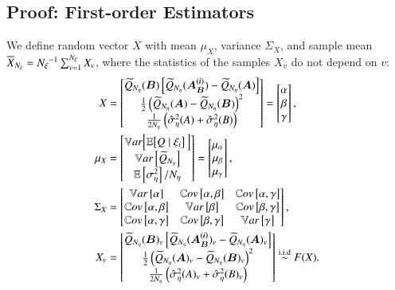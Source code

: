 \subsection{Proof: First-order Estimators} \label{sec:proof-first-order}
We define random vector $X$ with mean $\mu_X$, variance $\Sigma_X$, and sample mean $\overline{X}_{{N_\xi}} = {N_\xi}^{-1} \sum_{v=1}^{{N_\xi}} X_v$, where the statistics of the samples $X_v$ do not depend on $v$:
\begin{align} \label{m4eq:xmatrix}
    X &= \begin{bmatrix} \widetilde{Q}_{{N_\eta}}(\bm{B}) \left[ \widetilde{Q}_{{N_\eta}}(\bm{A_B^{(i)}}) - \widetilde{Q}_{{N_\eta}}(\bm{A}) \right] \\
                        \frac{1}{2} \left( \widetilde{Q}_{{N_\eta}}(\bm{A}) - \widetilde{Q}_{{N_\eta}}(\bm{B}) \right)^2 \\
                        \frac{1}{2{N_\eta}} \left( \hat{\sigma}^2_\eta(A) + \hat{\sigma}^2_\eta(B) \right)
        \end{bmatrix}
        = \begin{bmatrix} \alpha \\ \beta \\ \gamma \end{bmatrix}, \\
    \mu_X &= \begin{bmatrix} \mathbb{V}ar\Bigl[ \mathbb{E}\bigl[Q\mid\xi_i\bigr] \, {} \Bigr] \\ \mathbb{V}ar\left[\widetilde{Q}_{{N_\eta}}\right] \\ \mathbb{E}\left[\sigma^2_\eta\right]/{N_\eta} \end{bmatrix} 
        = \begin{bmatrix} \mu_\alpha \\ \mu_\beta \\ \mu_\gamma \end{bmatrix}, \\
    \Sigma_X &= \begin{bmatrix}
        \mathbb{V}ar\left[\alpha\right] & \mathbb{C}ov\left[\alpha,\beta\right] & \mathbb{C}ov\left[\alpha,\gamma\right] \\ 
        \mathbb{C}ov\left[\alpha,\beta\right] & \mathbb{V}ar\left[\beta\right] & \mathbb{C}ov\left[\beta,\gamma\right] \\
        \mathbb{C}ov\left[\alpha,\gamma\right] & \mathbb{C}ov\left[\beta,\gamma\right] & \mathbb{V}ar\left[\gamma\right]
    \end{bmatrix} , \\
    X_v &= \begin{bmatrix} \widetilde{Q}_{{N_\eta}}(\bm{B})_v \left[ \widetilde{Q}_{{N_\eta}}(\bm{A_B^{(i)}})_v - \widetilde{Q}_{{N_\eta}}(\bm{A})_v \right] \\
                        \frac{1}{2} \left( \widetilde{Q}_{{N_\eta}}(\bm{A})_v - \widetilde{Q}_{{N_\eta}}(\bm{B})_v \right)^2 \\
                        \frac{1}{2{N_\eta}} \left( \hat{\sigma}^2_\eta(A)_v + \hat{\sigma}^2_\eta(B)_v \right)
        \end{bmatrix} \overset{\operatorname{i.i.d}}{\sim} F(X) .
\end{align}


